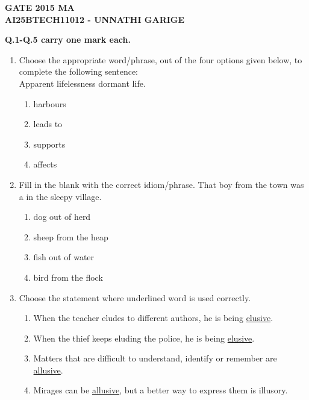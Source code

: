 \documentclass[journal]{IEEEtran}
\numberwithin{equation}{enumi}
\numberwithin{figure}{enumi}
\begin{document}




\begin{center}
    \LARGE \textbf{GATE 2015 MA}\\[0.5em]
    \large \textbf{AI25BTECH11012 - UNNATHI GARIGE}
\end{center}

 \textbf{Q.1-Q.5 carry one mark each.}

 \begin{enumerate}
     \item Choose the appropriate word/phrase, out of the four options given below, to complete the following sentence:\\
Apparent lifelessness \underline{\hspace{2cm}} dormant life.
\hfill{}
\begin{multicols}{4}
\begin{enumerate}
    \item harbours
    \item leads to
    \item supports
    \item affects
\end{enumerate}
\end{multicols}


\item Fill in the blank with the correct idiom/phrase. \hfill{}
That boy from the town was a \underline{\hspace{2cm}} in the sleepy village.
\hfill{}
\begin{multicols}{2}
\begin{enumerate}
    \item dog out of herd
    \item sheep from the heap
    \item fish out of water
    \item bird from the flock
\end{enumerate}
\end{multicols}


\item Choose the statement where underlined word is used correctly.
\hfill{}
\begin{enumerate}
    \item When the teacher eludes to different authors, he is being \underline{elusive}.
    \item When the thief keeps eluding the police, he is being \underline{elusive}.
    \item Matters that are difficult to understand, identify or remember are \underline{allusive}.
    \item Mirages can be \underline{allusive}, but a better way to express them is illusory.
\end{enumerate}



\end{enumerate}
\end{document}
